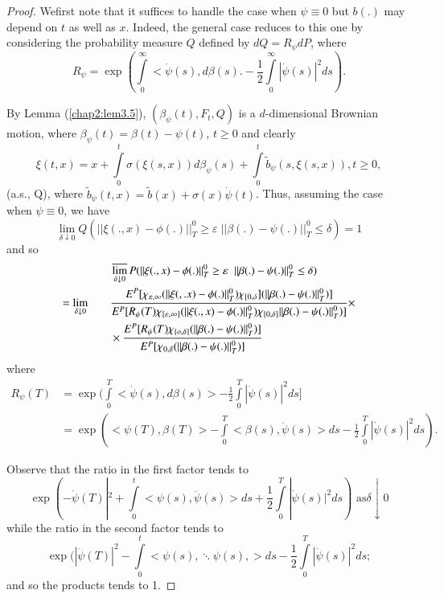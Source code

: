 \begin{proof}
We\pageoriginale first note that it suffices to handle the case when
$\psi \equiv 0$ but $b(.)$ may depend on $t$ as well as $x$. Indeed,
the general case reduces to this one by considering the probability
measure $Q$ defined by $dQ = R_\psi dP$, where  
$$
R_\psi  = \exp(\int\limits^\infty_0 < \dot{\psi}(s), d\beta(s) . -
\frac{1}{2}\int\limits_0^{\infty} | \dot{\psi}(s)|^2 ds). 
$$

By Lemma (\ref{chap2:lem3.5}), $(\beta_{\psi}(t), F_t, Q)$ is a
$d$-dimensional Brownian 
motion, where $\beta_{\psi}(t)=\beta(t)-\psi(t)$, $t \geq 0$ and clearly 
$$
\xi(t, x)=x+\int\limits_0^t \sigma(\xi (s,x))d
\beta_{\psi}(s)+\int\limits_0^t \tilde{b}_{\psi}(s, \xi(s, x)), t\geq
0, 
$$
(a.s., Q), where $\tilde{b}_{\psi}(t,
x)=\tilde{b}(x)+\sigma(x)\dot{\psi}(t)$. Thus, assuming the case when
$\psi \equiv 0$, we have 
$$
\lim_{\delta \downarrow 0} Q(|| \xi(., x)-\phi(.)||^0_T \geq \varepsilon
\; || \beta(.)- \psi(.)||^0_T \leq \delta )=1 
$$
and so
\begin{align*}
& \varlimsup_{\delta \downarrow 0} P(||\xi(., x)- \phi(.)||^0_T \geq
\varepsilon \;\; ||\beta (.)-\psi(.)||^0_T \leq \delta ) \\
=\lim_{\delta \downarrow 0} \qquad &
\frac{E^P[\chi_{\varepsilon, \infty}(||\xi 
    (,.x)-\phi(.)||_T^0)\chi_{[0,
        \delta}](||\beta(.)-\psi(.)||^0_T)]}{E^P[R_{\psi}(T)\chi_{[\varepsilon,
        \infty]}(||\xi(., x)-\phi(.)||^0_T)\chi_{[0,
        \delta]}||\beta(.)-\psi(.)||^0_T)]} \times\\
& \times \frac{E^P[R_{\psi}(T)\chi_{[o,
        \delta]}(||\beta(.)-\psi(.)||^0_T)]}{E^P[\chi_{0,
      \delta}(||\beta(.)-\psi(.)||^0_T)]} 
\end{align*}
where
\begin{align*}
R_{\psi}(T) &=\exp (\int\limits_0^T < \dot{\psi}(s),d\beta(s) > -
\frac{1}{2}\int\limits_0^T | \dot{\psi}(s)|^2 ds]\\ 
&=\exp (< \psi (T), \beta(T)> -\int\limits_0^T < \beta(s), \ddot{\psi}(s) >
ds - \frac{1}{2}\int\limits_0^T|\dot{\psi}(s)|^2 ds). 
\end{align*}\pageoriginale

Observe that the ratio  in the first factor tends to 
$$
\exp(- \dot{\psi} (T) |^2 + \int\limits_{0}^t < \psi(s), \ddot{\psi} (s) > ds + 
\frac{1}{2} \int\limits_{0}^T| \dot{\psi}(s)|^2 ds) \text { as
} \delta \downarrow 0 
$$
while the ratio in the second factor tends to  
$$
\exp( |\dot{\psi} (T) |^2 -\int\limits_{0}^t < \psi(s),
\ddots{\psi}(s), > ds - 
\frac{1}{2} \int\limits_{0}^T| \dot{\psi}(s)|^2 ds; 
$$
and so the products tends to 1. 


\end{proof}
